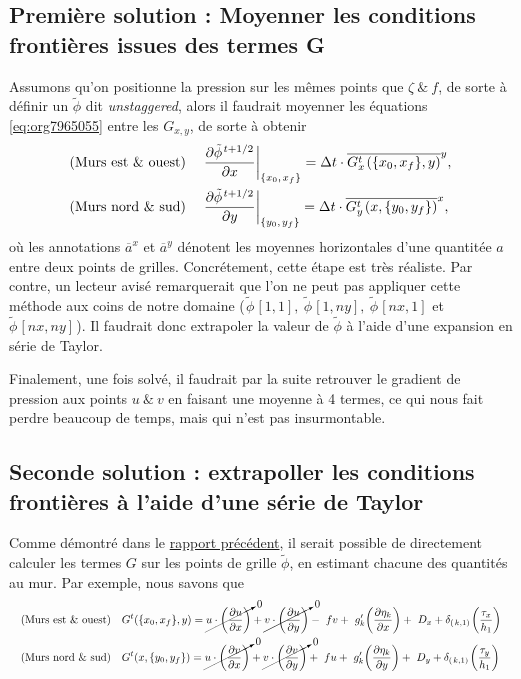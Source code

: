 \documentclass[10pt]{report}
\numberwithin{equation}{section}
\newcommand{\pt}{\hspace{1pt}} %
\newcommand{\xmean}[1]{\overline{#1}^x}
\newcommand{\ymean}[1]{\overline{#1}^y}
\begin{document}
\subsection{Première solution : Moyenner les conditions frontières issues des termes G}
\label{sec:org6cc6469}

Assumons qu'on positionne la pression sur les mêmes points que \(\zeta\ \& \ f\), de sorte à définir un \(\tilde{\phi}\) dit \emph{unstaggered}, alors il faudrait moyenner les équations \ref{eq:org7965055} entre les \(G_{x,y}\), de sorte à obtenir
\begin{subequations}
\label{eq:org0ce1ca9}
\begin{align}
&& &\text{(Murs est \& ouest)}
&&\eval{\pdv{\tilde{\phi}^{\pt t+1/2}}{x}}_\qty{x_0,\pt x_f}
= \Delta t\cdot \ymean{G^t_x\pt (\{x_0,x_f\},y)},&&\\
&& &\text{(Murs nord \& sud)}
&&\eval{\pdv{\tilde{\phi}^{\pt t+1/2}}{y}}_\qty{y_0,\pt y_f}
=  \Delta t\cdot \xmean{G^t_y\pt (x,\{y_0,y_f\})},&&
\end{align}
\end{subequations}
où les annotations \(\xmean{a}\) et \(\ymean{a}\) dénotent les moyennes horizontales d'une quantitée \(a\) entre deux points de grilles.
Concrétement, cette étape est très réaliste.
Par contre, un lecteur avisé remarquerait que l'on ne peut pas appliquer cette méthode aux coins de notre domaine (\(\pt \tilde{\phi}\pt[1,1],\ \tilde{\phi}\pt[1,ny],\ \tilde{\phi}\pt[nx,1]\) et \(\tilde{\phi}\pt[nx,ny]\pt\)).
Il faudrait donc extrapoler la valeur de \(\tilde{\phi}\) à l'aide d'une expansion en série de Taylor.\bigskip

Finalement, une fois solvé, il faudrait par la suite retrouver le gradient de pression aux points \(u\ \&\ v\) en faisant une moyenne à 4 termes, ce qui nous fait perdre beaucoup de temps, mais qui n'est pas insurmontable.

\subsection{Seconde solution : extrapoller les conditions frontières à l'aide d'une série de Taylor}
\label{sec:orgdacff7f}
Comme démontré dans le \href{rapport-2023-04-21.org}{rapport précédent}, il serait possible de directement calculer les termes \(G\) sur les points de grille \(\tilde{\phi}\), en estimant chacune des quantités au mur.
Par exemple, nous savons que 
\begin{subequations}
\begin{align}
&& &\text{(Murs est \& ouest)}&&
G^t(\{x_0,x_f\},y) =
\cancelto{0}{u \cdot \qty(\pdv{u}{x})} + \cancelto{0}{v \cdot \qty(\pdv{u}{y})}
-\ fv
+\ g'_{k} \qty(\pdv{\eta_k}{x})
+\ D_x
+\delta_\qty(\pt k,1)\pt \qty(\frac{\tau_x}{h_1})&&\\
%
&& &\text{(Murs nord \& sud)} &&
G^t(x,\{y_0,y_f\}) =
\cancelto{0}{u \cdot \qty(\pdv{v}{x})} + \cancelto{0}{v \cdot \qty(\pdv{v}{y})}
+\ fu
+\ g'_{k} \qty(\pdv{\eta_k}{y})
+\ D_y
+\delta_\qty(\pt k,1)\pt \qty(\frac{\tau_y}{h_1})&&
\end{align}
\end{subequations}
\end{document}
